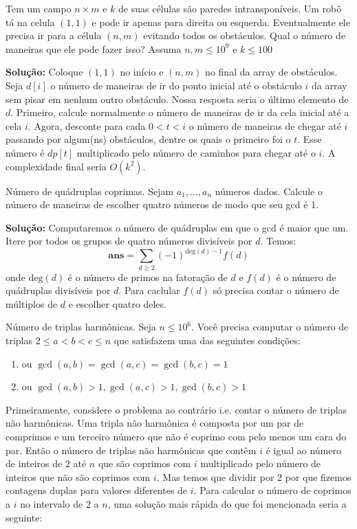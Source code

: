  Tem um campo $n \times m$ e $k$ de suas células são paredes intransponíveis. Um robô tá na celula $(1, 1)$ e pode ir apenas para direita ou esquerda. Eventualmente ele precisa ir para a célula $(n, m)$ evitando todos os obstáculos. Qual o número de maneiras que ele pode fazer isso? Assuma $n, m \leq 10^9$ e $k \leq 100$

\textbf{Solução:} Coloque $(1, 1)$ no início e $(n, m)$ no final da array de obstáculos. Seja $d[i]$ o número de maneiras de ir do ponto inicial até o obstáculo $i$ da array sem pisar em nenhum outro obstáculo. Nossa resposta seria o último elemento de $d$. Primeiro, calcule normalmente o número de maneiras de ir da cela inicial até a cela $i$. Agora, desconte para cada $0 < t < i$ o número de maneiras de chegar até $i$ passando por algum(ns) obstáculos, dentre os quais o primeiro foi o $t$. Esse número é $dp[t]$ multiplicado pelo número de caminhos para chegar até o $i$. A complexidade final seria $O(k^2)$.

 Número de quádruplas coprimas. Sejam $a_1, \dots, a_n$ números dados. Calcule o número de maneiras de escolher quatro números de modo que seu gcd é 1.

\textbf{Solução:} Computaremos o número de quádruplas em que o gcd é maior que um. Itere por todos os grupos de quatro números divisíveis por $d$. Temos:
$$\textbf{ans} = \sum\limits_{d \geq 2} (-1)^{\text{deg}(d)-1} f(d)$$
onde $\text{deg}(d)$ é o número de primos na fatoração de $d$ e $f(d)$ é o número de quádruplas divisíveis por $d$. Para caclular $f(d)$ só precisa contar o número de múltiplos de $d$ e escolher quatro deles.

 Número de triplas harmônicas. Seja $n \leq 10^6$. Você precisa computar o número de triplas $2 \leq a < b < c \leq n$ que satisfazem uma das seguintes condições:

\begin{enumerate}
    \item ou $\gcd(a, b) = \gcd(a, c) = \gcd(b, c) = 1$
    \item ou $\gcd(a, b) > 1, \gcd(a, c) > 1, \gcd(b, c) > 1$
\end{enumerate}

Primeiramente, considere o problema ao contrário i.e. contar o número de triplas não harmônicas. Uma tripla não harmônica é composta por um par de comprimos e um terceiro número que não é coprimo com pelo menos um cara do par. Então o número de triplas não harmônicas que contêm $i$ é igual ao número de inteiros de $2$ até $n$ que são coprimos com $i$ multiplicado pelo número de inteiros que não são coprimos com $i$. Mas temos que dividir por $2$ por que fizemos contagens duplas para valores diferentes de $i$. Para calcular o número de coprimos a $i$ no intervalo de $2$ a $n$, uma solução mais rápida do que foi mencionada seria a seguinte:

